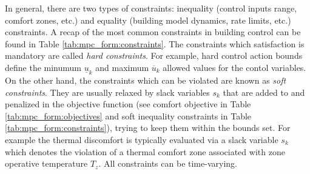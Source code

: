 \documentclass[10pt]{article}
\begin{document}
In general, there are two types of constraints:
inequality (control inputs range, comfort zones, etc.) and equality 
(building model dynamics, rate limits, etc.) constraints.
A recap of the most common constraints in building control can be found in
Table \ref{tab:mpc_form:constraints}.
The constraints which satisfaction is mandatory are called 
\textit{hard constraints}. For example, hard control action
bounds define the minumum $\underline{u}_k$ and maximum $\overline{u}_k$ allowed values for the contol variables.
 On the other hand, the constraints which can 
be violated are known as \textit{soft constraints}. They are usually relaxed
by slack variables $s_k$ that are added to and
penalized in the objective function (see comfort objective in Table
\ref{tab:mpc_form:objectives} and soft inequality constraints in Table \ref{tab:mpc_form:constraints}), trying to keep them within the bounds set. 
For example the thermal discomfort is typically evaluated via a slack variable $s_k$ which denotes the violation of a thermal comfort zone associated with zone operative temperature $T_z$.
All constraints can be time-varying.
\end{document}
